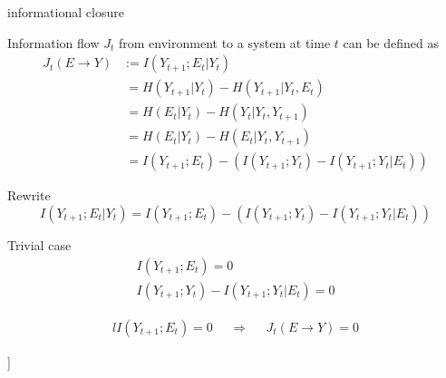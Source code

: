 \documentclass[utf8]{article}
\begin{document}
informational closure


Information flow $J_{t}$ from environment to a system at time $t$ can be defined as
\begin{equation}\label{eq:InformationFlow}
\left.\begin{array}
{rl}{J_{t}(E \rightarrow Y )} & {:= I(Y_{t+1};E_{t}|Y_{t})} \\
{ } & { \ = H(Y_{t+1}|Y_{t})-H(Y_{t+1}|Y_{t},E_{t})} \\
{ } & { \ = H(E_{t}|Y_{t})-H(Y_{t}|Y_{t},Y_{t+1})} \\
{ } & { \ = H(E_{t}|Y_{t})-H(E_{t}|Y_{t},Y_{t+1})}\\
{ } & { \ = I(Y_{t+1};E_{t}) - (I(Y_{t+1};Y_{t})-I(Y_{t+1};Y_{t}|E_{t}))}
\end{array}\right.
\end{equation}



Rewrite 
\begin{equation}
I(Y_{t+1};E_{t}|Y_{t}) = 
I(Y_{t+1};E_{t}) - (I(Y_{t+1};Y_{t})-I(Y_{t+1};Y_{t}|E_{t}))
\end{equation}



Trivial case
\begin{equation}
\left.\begin{array}
{l}{I(Y_{t+1};E_{t})=0}\\
{I(Y_{t+1};Y_{t})-I(Y_{t+1};Y_{t}|E_{t})=0}
\end{array}\right.
\end{equation}


\begin{equation}
\begin{aligned}
{l}{I(Y_{t+1};E_{t})=0}&&{\Rightarrow}&&{J_{t}(E \rightarrow Y )=0}
\end{aligned}
\end{equation}




\noindent [[ NTIC ]]
\end{document}
